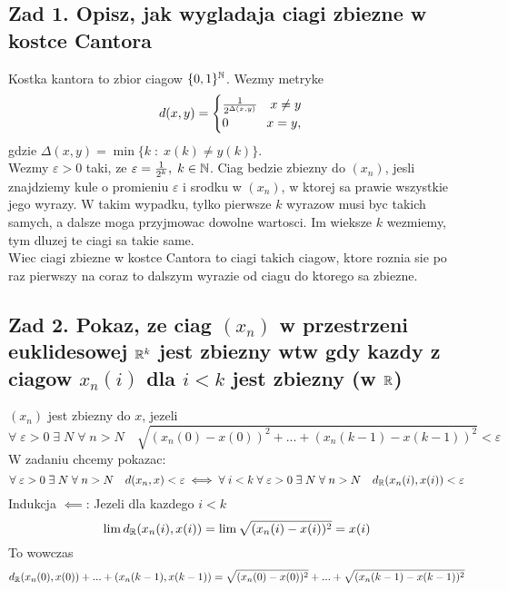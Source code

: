 \documentclass{article}
\begin{document}
\ttfamily
\subsection*{Zad 1. Opisz, jak wygladaja ciagi zbiezne w kostce Cantora}
    Kostka kantora to zbior ciagow $\{0,1\}^{\mathbb{N}}$. Wezmy metryke
    $$d(x,y)=\begin{cases}{1\over2^{\Delta(x,y)}}\quad x\neq y\\0\quad\quad\quad x=y,\end{cases}$$
    gdzie $\Delta(x,y)=\min\{k\;:\;x(k)\neq y(k)\}$. \medskip\\
    Wezmy $\varepsilon>0$ taki, ze $\varepsilon=\frac1{2^k},\;k\in\mathbb{N}$. Ciag bedzie zbiezny do $(x_n)$, jesli znajdziemy kule o promieniu $\varepsilon$ i srodku w $(x_n)$, w ktorej sa prawie wszystkie jego wyrazy. W takim wypadku, tylko pierwsze $k$ wyrazow musi byc takich samych, a dalsze moga przyjmowac dowolne wartosci. Im wieksze $k$ wezmiemy, tym dluzej te ciagi sa takie same.\smallskip\\
    Wiec ciagi zbiezne w kostce Cantora to ciagi takich ciagow, ktore roznia sie po raz pierwszy na coraz to dalszym wyrazie od ciagu do ktorego sa zbiezne.

\subsection*{Zad 2. Pokaz, ze ciag $(x_n)$ w przestrzeni euklidesowej $\mathbb{R}^k$ jest zbiezny wtw gdy kazdy z ciagow $x_n(i)$ dla $i<k$ jest zbiezny (w $\mathbb{R}$)}
    $(x_n)$ jest zbiezny do $x$, jezeli
    $$\forall\;\varepsilon>0\;\exists\;N\;\forall\;n>N\quad \sqrt{(x_n(0)-x(0))^2+...+(x_n(k-1)-x(k-1))^2}<\varepsilon$$
    W zadaniu chcemy pokazac:
    $$\forall\;\varepsilon>0\;\exists\;N\;\forall\;n>N\quad d(x_n, x)<\varepsilon\iff \forall\;i<k\;\forall\;\varepsilon>0\;\exists\;N\;\forall\;n>N\quad d_{\mathbb{R}}(x_n(i), x(i))<\varepsilon$$
    Indukcja $\impliedby$:
    Jezeli dla kazdego $i<k$
    $$\lim d_{\mathbb{R}}(x_n(i), x(i))=\lim \sqrt{(x_n(i)-x(i))^2} = x(i)$$
    To wowczas
    $$d_{\mathbb{R}}(x_n(0), x(0))+...+(x_n(k-1), x(k-1))=\sqrt{(x_n(0)-x(0))^2}+...+\sqrt{(x_n(k-1)-x(k-1))^2}$$
\end{document}
